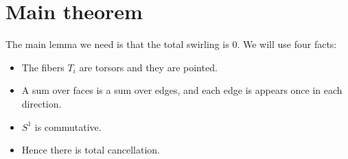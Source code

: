 \section{Main theorem}

\begin{frame}
The main lemma we need is that the total swirling is 0. We will use four facts:
\begin{itemize}
\item The fibers \( T_i \) are torsors and they are pointed.
\item A sum over faces is a sum over edges, and each edge is appears once in each direction.
\item \( S^1 \) is commutative.
\item Hence there is total cancellation.
\end{itemize}
\end{frame}

